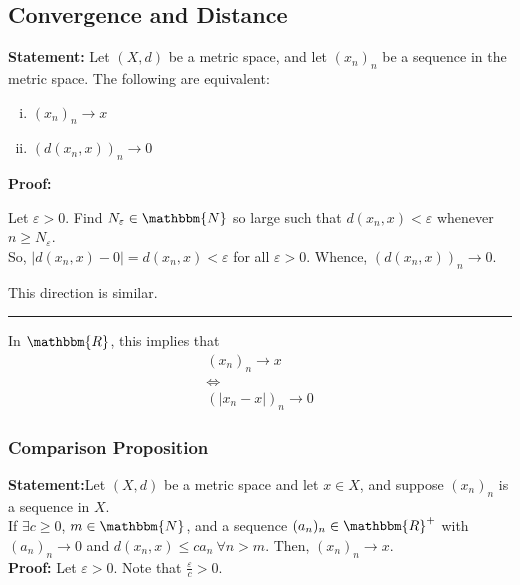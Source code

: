 \documentclass[10pt]{extarticle}
\newcommand{\N}{\mathbbm{N}}
\newcommand{\R}{\mathbbm{R}}
\begin{document}
    \subsection{Convergence and Distance}%
    \textbf{Statement:} Let $(X,d)$ be a metric space, and let $(x_n)_n$ be a sequence in the metric space. The following are equivalent:
      \begin{enumerate}[(i)]
        \item $(x_n)_n\rightarrow x$
        \item $\left(d(x_n,x)\right)_n \rightarrow 0$
      \end{enumerate}
      \textbf{Proof:}
      \begin{description}[font=\normalfont]
        \item[(i) $\Rightarrow$ (b)] Let $\varepsilon > 0$. Find $N_{\varepsilon}\in\N$ so large such that $d(x_n,x) < \varepsilon$ whenever $n \geq N_{\varepsilon}$.\\

          So, $|d(x_n,x)-0| = d(x_n,x) < \varepsilon$ for all $\varepsilon > 0$. Whence, $\left(d(x_n,x)\right)_n \rightarrow 0$.
        \item[(ii) $\Rightarrow$ (i)] This direction is similar.
      \end{description}
      \begin{center}
        \rule{0.5\textwidth}{0.4pt}
      \end{center}
    In $\R$, this implies that
    \begin{align*}
      (x_n)_n \rightarrow x\\
      \Leftrightarrow\\
      (|x_n -x|)_n \rightarrow 0
    \end{align*}
  \subsubsection{Comparison Proposition}%
  \textbf{Statement:}Let $(X,d)$ be a metric space and let $x\in X$, and suppose $(x_n)_n$ is a sequence in $X$.\\

    If $\exists c\geq 0$, $m\in\N$, and a sequence $(a_n)_n\in\R^+$ with $(a_n)_n \rightarrow 0$ and $d(x_n,x) \leq c a_n~\forall n > m$. Then, $(x_n)_n\rightarrow x$.\\
    
    \textbf{Proof:} Let $\varepsilon > 0$. Note that $\frac{\varepsilon}{c} > 0$.\\
\end{document}
